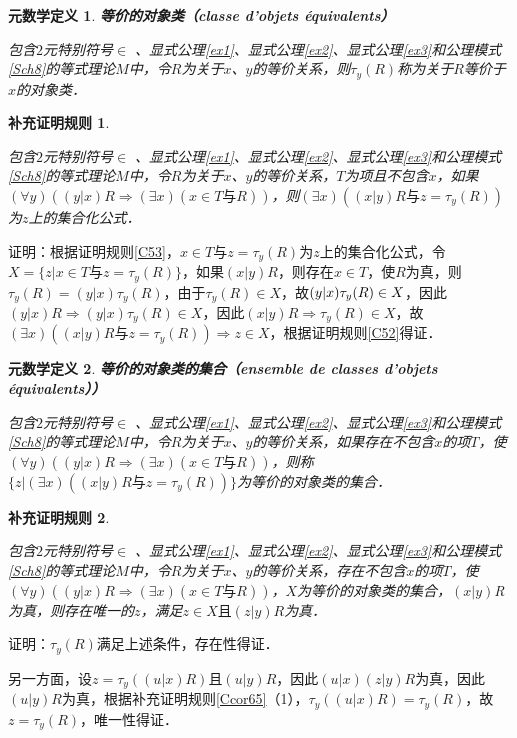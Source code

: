 \documentclass[12pt, a4paper, oneside]{book}
\newtheorem{metadef}{元数学定义}
\newtheorem{Ccor}{补充证明规则}
\begin{document}
			\begin{metadef}
				\textbf{等价的对象类（classe d'objets équivalents）}
				\par
				包含$2$元特别符号$\in$ 、显式公理\ref{ex1}、显式公理\ref{ex2}、显式公理\ref{ex3}和公理模式\ref{Sch8}的等式理论$M$中，令$R$为关于$x$、$y$的等价关系，则$\tau_y(R)$称为关于$R$等价于$x$的对象类．
			\end{metadef}
			
			\begin{Ccor}\label{Ccor66}
				\hfill\par
				包含$2$元特别符号$\in$ 、显式公理\ref{ex1}、显式公理\ref{ex2}、显式公理\ref{ex3}和公理模式\ref{Sch8}的等式理论$M$中，令$R$为关于$x$、$y$的等价关系，$T$为项且不包含$x$，如果$(\forall y)((y|x)R\Rightarrow (\exists x)(x\in T\text{与}R))$，则$(\exists x)((x|y)R\text{与}z=\tau_y(R))$为$z$上的集合化公式．
			\end{Ccor}
			证明：根据证明规则\ref{C53}，$x\in T\text{与}z=\tau_y(R)$为$z$上的集合化公式，令$X=\{z|x\in T\text{与}z=\tau_y(R)\}$，如果$(x|y)R$，则存在$x\in T$，使$R$为真，则$\tau_y(R)=(y|x)\tau_y(R)$，由于$\tau_y(R)\in X$，故$(y|x)\tau_y(R)\\\in X$，因此$(y|x)R\Rightarrow (y|x)\tau_y(R)\in X$，因此$(x|y)R\Rightarrow \tau_y(R)\in X$，故$(\exists x)((x|y)R\text{与}z=\tau_y(R))\Rightarrow z\in X$，根据证明规则\ref{C52}得证．						
			
			\begin{metadef}
				\textbf{等价的对象类的集合（ensemble de classes d'objets équivalents））}
				\par
				包含$2$元特别符号$\in$ 、显式公理\ref{ex1}、显式公理\ref{ex2}、显式公理\ref{ex3}和公理模式\ref{Sch8}的等式理论$M$中，令$R$为关于$x$、$y$的等价关系，如果存在不包含$x$的项$T$，使$(\forall y)((y|x)R\Rightarrow (\exists x)(x\in T\text{与}R))$，则称$\{z|(\exists x)((x|y)R\text{与}z=\tau_y(R))\}$为等价的对象类的集合．
			\end{metadef}
						
			\begin{Ccor}\label{Ccor67}
				\hfill\par
				包含$2$元特别符号$\in$ 、显式公理\ref{ex1}、显式公理\ref{ex2}、显式公理\ref{ex3}和公理模式\ref{Sch8}的等式理论$M$中，令$R$为关于$x$、$y$的等价关系，存在不包含$x$的项$T$，使$(\forall y)((y|x)R\Rightarrow (\exists x)(x\in T\text{与}R))$，$X$为等价的对象类的集合，$(x|y)$R为真，则存在唯一的$z$，满足$z\in X且(z|y)R$为真．
			\end{Ccor}
			证明：$\tau_y(R)$满足上述条件，存在性得证．
			\par
			另一方面，设$z=\tau_y((u|x)R)$且$(u|y)R$，因此$(u|x)(z|y)R$为真，因此$(u|y)R$为真，根据补充证明规则\ref{Ccor65}（1），$\tau_y((u|x)R)=\tau_y(R)$，故$z=\tau_y(R)$，唯一性得证．
			
\end{document}
